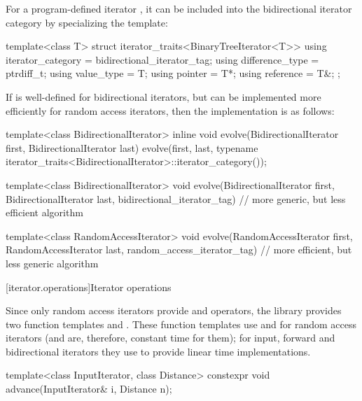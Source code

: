 \pnum
\begin{example}
For a program-defined iterator
,
it can be included
into the bidirectional iterator category by specializing the
template:

\begin{codeblock}
template<class T> struct iterator_traits<BinaryTreeIterator<T>> {
  using iterator_category = bidirectional_iterator_tag;
  using difference_type   = ptrdiff_t;
  using value_type        = T;
  using pointer           = T*;
  using reference         = T&;
};
\end{codeblock}
\end{example}

\pnum
\begin{example}
If
is well-defined for bidirectional iterators, but can be implemented more
efficiently for random access iterators, then the implementation is as follows:

\begin{codeblock}
template<class BidirectionalIterator>
inline void
evolve(BidirectionalIterator first, BidirectionalIterator last) {
  evolve(first, last,
    typename iterator_traits<BidirectionalIterator>::iterator_category());
}

template<class BidirectionalIterator>
void evolve(BidirectionalIterator first, BidirectionalIterator last,
  bidirectional_iterator_tag) {
  // more generic, but less efficient algorithm
}

template<class RandomAccessIterator>
void evolve(RandomAccessIterator first, RandomAccessIterator last,
  random_access_iterator_tag) {
  // more efficient, but less generic algorithm
}
\end{codeblock}
\end{example}

[iterator.operations]{Iterator operations}

\pnum
Since only random access iterators provide
\tcode{+}
and
\tcode{-}
operators, the library provides two
function templates
and
.
These
function templates
use
\tcode{+}
and
\tcode{-}
for random access iterators (and are, therefore, constant
time for them); for input, forward and bidirectional iterators they use
\tcode{++}
to provide linear time
implementations.

%
\begin{itemdecl}
template<class InputIterator, class Distance>
  constexpr void advance(InputIterator& i, Distance n);
\end{itemdecl}

